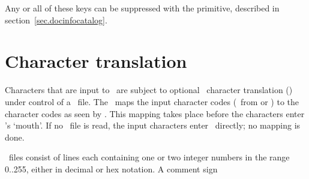 \documentclass{pdftexmanual}
\begin{document}
Any or all of these keys can be suppressed with the
 primitive, described in
section~\ref{sec.docinfocatalog}.

\chapter{Character translation}

Characters that are input to \PDFTEX\ are subject to optional \TEX\
character translation (\TCX) under control of a \TCX\ file. The \TCX\
maps the input character codes (\eg\ from  or ) to
the character codes as seen by \PDFTEX. This mapping takes place before
the characters enter \PDFTEX's `mouth'. If no \TCX\ file is read, the
input characters enter \PDFTEX\ directly; no mapping is done.

\TCX\ files consist of lines each containing one or two integer numbers
in the range 0..255, either in decimal or hex notation. A comment sign
\end{document}
